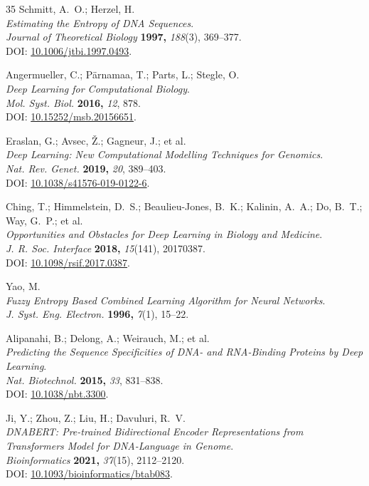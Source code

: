 \documentclass{article}
\theoremstyle{remark}
\begin{document}
\begin{thebibliography}{35}
Schmitt, A.~O.; Herzel, H.\\
\textit{Estimating the Entropy of DNA Sequences}.\\
\textit{Journal of Theoretical Biology} \textbf{1997,} \textit{188}(3), 369--377.\\
DOI: \href{https://doi.org/10.1006/jtbi.1997.0493}{10.1006/jtbi.1997.0493}.

Angermueller, C.; Pärnamaa, T.; Parts, L.; Stegle, O.\\
\textit{Deep Learning for Computational Biology}.\\
\textit{Mol. Syst. Biol.} \textbf{2016,} \textit{12}, 878.\\
DOI: \href{https://doi.org/10.15252/msb.20156651}{10.15252/msb.20156651}.

Eraslan, G.; Avsec, \v{Z}.; Gagneur, J.; et al.\\
\textit{Deep Learning: New Computational Modelling Techniques for Genomics}.\\
\textit{Nat. Rev. Genet.} \textbf{2019,} \textit{20}, 389--403.\\
DOI: \href{https://doi.org/10.1038/s41576-019-0122-6}{10.1038/s41576-019-0122-6}.

Ching, T.; Himmelstein, D.~S.; Beaulieu-Jones, B.~K.; Kalinin, A.~A.; Do, B.~T.; Way, G.~P.; et al.\\
\textit{Opportunities and Obstacles for Deep Learning in Biology and Medicine}.\\
\textit{J. R. Soc. Interface} \textbf{2018,} \textit{15}(141), 20170387.\\
DOI: \href{https://doi.org/10.1098/rsif.2017.0387}{10.1098/rsif.2017.0387}.

Yao, M.\\
\textit{Fuzzy Entropy Based Combined Learning Algorithm for Neural Networks}.\\
\textit{J. Syst. Eng. Electron.} \textbf{1996,} \textit{7}(1), 15--22.

Alipanahi, B.; Delong, A.; Weirauch, M.; et al.\\
\textit{Predicting the Sequence Specificities of DNA- and RNA-Binding Proteins by Deep Learning}.\\
\textit{Nat. Biotechnol.} \textbf{2015,} \textit{33}, 831--838.\\
DOI: \href{https://doi.org/10.1038/nbt.3300}{10.1038/nbt.3300}.

Ji, Y.; Zhou, Z.; Liu, H.; Davuluri, R.~V.\\
\textit{DNABERT: Pre-trained Bidirectional Encoder Representations from Transformers Model for DNA-Language in Genome}.\\
\textit{Bioinformatics} \textbf{2021,} \textit{37}(15), 2112--2120.\\
DOI: \href{https://doi.org/10.1093/bioinformatics/btab083}{10.1093/bioinformatics/btab083}.


\end{thebibliography}
\end{document}
